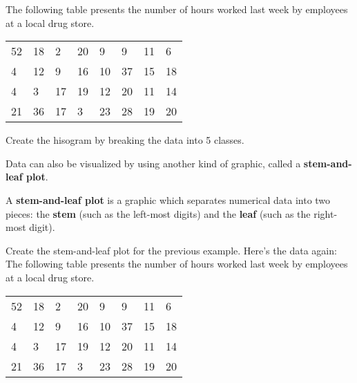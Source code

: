 \documentclass[notes]{subfiles}
\begin{document}
		\begin{ex}
			The following table presents the number of hours worked last week by employees at a local drug store.
			\begin{center}
				\begin{tabular}{llllllll}
					52&18&2&20&9&9&11&6\\
					4&12&9&16&10&37&15&18\\
					4&3&17&19&12&20&11&14\\
					21&36&17&3&23&28&19&20
				\end{tabular}
			\end{center}
			Create the hisogram by breaking the data into 5 classes.
		\end{ex}
		
		Data can also be visualized by using another kind of graphic, called a \textbf{stem-and-leaf plot}.

		\begin{defn}
			A \textbf{stem-and-leaf plot} is a graphic which separates numerical data into two pieces: the \textbf{stem} (such as the left-most digits) and the \textbf{leaf} (such as the right-most digit).%
		\end{defn}
			\newpage

		\begin{ex}
			Create the stem-and-leaf plot for the previous example.  Here's the data again:\\
			
			The following table presents the number of hours worked last week by employees at a local drug store.
			\begin{center}
				\begin{tabular}{llllllll}
					52&18&2&20&9&9&11&6\\
					4&12&9&16&10&37&15&18\\
					4&3&17&19&12&20&11&14\\
					21&36&17&3&23&28&19&20
				\end{tabular}
			\end{center}
		\end{ex}
\end{document}
